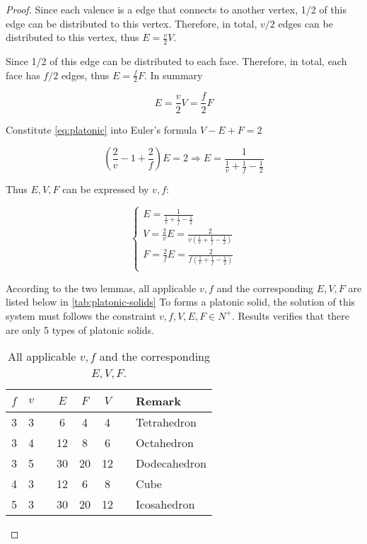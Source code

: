 \begin{proof}
    Since each valence is a edge that connects to another vertex, 1/2 of this edge can be distributed to this vertex. Therefore, in total, $v/2$ edges can be distributed to this vertex, thus $E = \frac{v}{2}V$. 
    
    Since 1/2 of this edge can be distributed to each face. Therefore, in total, each face has $f/2$ edges, thus $E = \frac{f}{2}F$. In summary

    \begin{equation}
        E = \frac{v}{2}V = \frac{f}{2}F
        \label{eq:platonic}
    \end{equation}

    Constitute \autoref{eq:platonic} into Euler's formula $V - E + F = 2$

    \begin{equation}
        (\frac{2}{v} - 1 + \frac{2}{f}) E = 2
        \Rightarrow E = \frac{1}{\frac{1}{v} + \frac{1}{f} - \frac{1}{2}}
    \end{equation}

    Thus $E, V, F$ can be expressed by $v, f$:

    \begin{equation}
        \begin{cases}
            E = \frac{1}{\frac{1}{v} + \frac{1}{f} - \frac{1}{2}}\\
            V = \frac{2}{v} E = \frac{2}{v(\frac{1}{v} + \frac{1}{f} - \frac{1}{2})}\\
            F = \frac{2}{f} E = \frac{2}{f(\frac{1}{v} + \frac{1}{f} - \frac{1}{2})}\\
        \end{cases}
    \end{equation}

    According to the two lemmas, all applicable $v, f$ and the corresponding $E, V, F$ are listed below in \autoref{tab:platonic-solids} To forms a platonic solid, the solution of this system must follows the constraint $v, f, V, E, F \in N^+$. Results verifies that there are only 5 types of platonic solids.

    \begin{table}[H]
        \centering
        \caption{All applicable $v, f$ and the corresponding $E, V, F$.}
        \begin{tabular}{ccccccll}
            \toprule
            $f$ & $v$ && $E$ & $F$ & $V$ && Remark\\
            \midrule 
            3 & 3 && 6 & 4 & 4 && Tetrahedron\\
            3 & 4 && 12 & 8 & 6 && Octahedron\\
            3 & 5 && 30 & 20 & 12 && Dodecahedron\\
            4 & 3 && 12 & 6 & 8 && Cube\\
            5 & 3 && 30 & 20 & 12 && Icosahedron\\
            \bottomrule 
        \end{tabular}
        \label{tab:platonic-solids}
    \end{table}
\end{proof}


